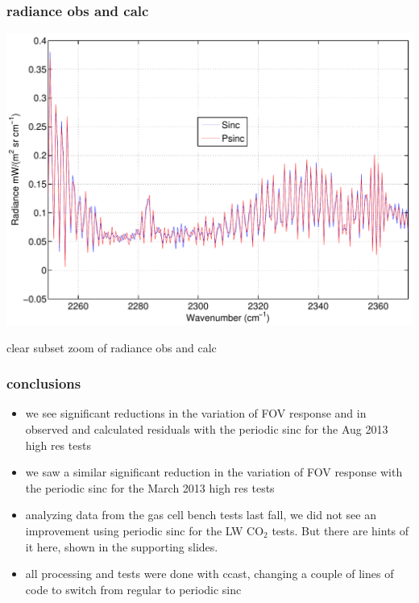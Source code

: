 \documentclass[11pt]{beamer}
\begin{document}
\begin{frame}
\frametitle{radiance obs and calc}

\begin{center}
  \includegraphics[scale=0.4]{strow_figs/sinc_vs_psinc_rad_sw.pdf}
\end{center}

clear subset zoom of radiance obs and calc 

\end{frame}
\begin{frame}
\frametitle{conclusions}

\begin{itemize}
  \item we see significant reductions in the variation of FOV
    response and in observed and calculated residuals with the
    periodic sinc for the Aug 2013 high res tests

  \item we saw a similar significant reduction in the variation of
    FOV response with the periodic sinc for the March 2013 high res
    tests

  \item analyzing data from the gas cell bench tests last fall, we
    did not see an improvement using periodic sinc for the LW CO$_2$
    tests.  But there are hints of it here, shown in the supporting
    slides.
    
  \item all processing and tests were done with ccast, changing a
    couple of lines of code to switch from regular to periodic sinc

\end{itemize}

\end{frame}
\end{document}
